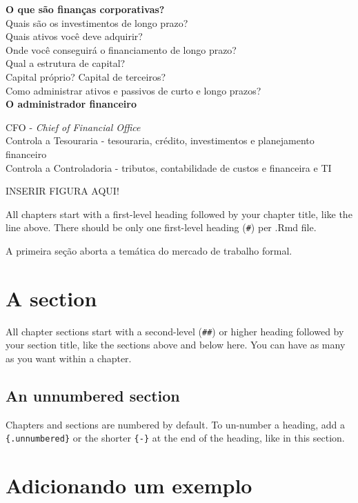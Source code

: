 \documentclass[
]{book}
\theoremstyle{definition}
\theoremstyle{definition}
\theoremstyle{definition}
\theoremstyle{definition}
\theoremstyle{remark}
\begin{document}
\textbf{O que são finanças corporativas?}\\
Quais são os investimentos de longo prazo?\\
Quais ativos você deve adquirir?\\
Onde você conseguirá o financiamento de longo prazo?\\
Qual a estrutura de capital?\\
Capital próprio? Capital de terceiros?\\
Como administrar ativos e passivos de curto e longo prazos?\\

\textbf{O administrador financeiro}

CFO - \emph{Chief of Financial Office}\\
Controla a Tesouraria - tesouraria, crédito, investimentos e planejamento financeiro\\
Controla a Controladoria - tributos, contabilidade de custos e financeira e TI

INSERIR FIGURA AQUI!

All chapters start with a first-level heading followed by your chapter title, like the line above. There should be only one first-level heading (\texttt{\#}) per .Rmd file.

A primeira seção aborta a temática do mercado de trabalho formal.

\hypertarget{a-section}{%
\section{A section}\label{a-section}}

All chapter sections start with a second-level (\texttt{\#\#}) or higher heading followed by your section title, like the sections above and below here. You can have as many as you want within a chapter.

\hypertarget{an-unnumbered-section}{%
\subsection*{An unnumbered section}\label{an-unnumbered-section}}

Chapters and sections are numbered by default. To un-number a heading, add a \texttt{\{.unnumbered\}} or the shorter \texttt{\{-\}} at the end of the heading, like in this section.

\hypertarget{adicionando-um-exemplo}{%
\section{Adicionando um exemplo}\label{adicionando-um-exemplo}}
\end{document}
